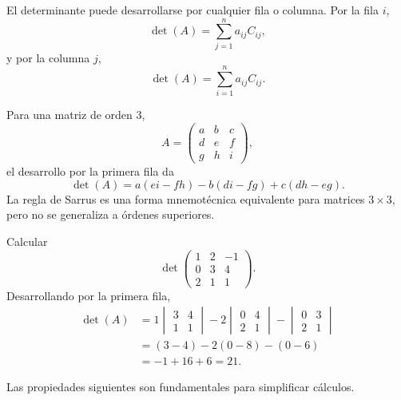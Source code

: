 El determinante puede desarrollarse por cualquier fila o columna. Por la fila $i$,
\[
\det(A)=\sum_{j=1}^n a_{ij}C_{ij},
\]
y por la columna $j$,
\[
\det(A)=\sum_{i=1}^n a_{ij}C_{ij}.
\]

Para una matriz de orden $3$,
\[
A=
\begin{pmatrix}
a&b&c\\
d&e&f\\
g&h&i
\end{pmatrix},
\]
el desarrollo por la primera fila da
\[
\det(A)
=a(ei-fh)-b(di-fg)+c(dh-eg).
\]
La regla de Sarrus es una forma mnemotécnica equivalente para matrices $3\times3$, pero no se generaliza a órdenes superiores.

\begin{example}
Calcular
\[
\det\begin{pmatrix}
1&2&-1\\
0&3&4\\
2&1&1
\end{pmatrix}.
\]
Desarrollando por la primera fila,
\begin{align*}
\det(A)
&=1\begin{vmatrix}3&4\\1&1\end{vmatrix}
-2\begin{vmatrix}0&4\\2&1\end{vmatrix}
-\begin{vmatrix}0&3\\2&1\end{vmatrix}\\
&=(3-4)-2(0-8)-(0-6)\\
&=-1+16+6=21.
\end{align*}
\end{example}

Las propiedades siguientes son fundamentales para simplificar cálculos.


